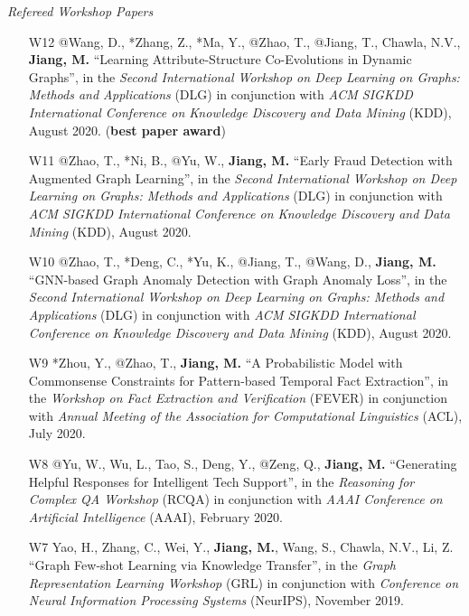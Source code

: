 \documentclass[10pt]{article}
\newenvironment{myindentpar}[1]%
{\begin{list}{}%
         {\setlength{\leftmargin}{#1}}%
         \item[]%
}
{\end{list}}
\newcounter{list}
\begin{document}
\begin{myindentpar}{0.00cm}
\hspace{-0.25cm}\textit{Refereed Workshop Papers}

\begin{enumerate}[leftmargin=.5cm]

\item[W12] @Wang, D., *Zhang, Z., *Ma, Y., @Zhao, T., @Jiang, T., Chawla, N.V., \textbf{Jiang, M.} ``Learning Attribute-Structure Co-Evolutions in Dynamic Graphs'', in the \textit{Second International Workshop on Deep Learning on Graphs: Methods and Applications} (DLG) in conjunction with \textit{ACM SIGKDD International Conference on Knowledge Discovery and Data Mining} (KDD), August 2020. (\textbf{best paper award})
		
\item[W11] @Zhao, T., *Ni, B., @Yu, W., \textbf{Jiang, M.} ``Early Fraud Detection with Augmented Graph Learning'', in the \textit{Second International Workshop on Deep Learning on Graphs: Methods and Applications} (DLG) in conjunction with \textit{ACM SIGKDD International Conference on Knowledge Discovery and Data Mining} (KDD), August 2020.

\item[W10] @Zhao, T., *Deng, C., *Yu, K., @Jiang, T., @Wang, D., \textbf{Jiang, M.} ``GNN-based Graph Anomaly Detection with Graph Anomaly Loss'', in the \textit{Second International Workshop on Deep Learning on Graphs: Methods and Applications} (DLG) in conjunction with \textit{ACM SIGKDD International Conference on Knowledge Discovery and Data Mining} (KDD), August 2020.

\item[W9] *Zhou, Y., @Zhao, T., \textbf{Jiang, M.} ``A Probabilistic Model with Commonsense Constraints for Pattern-based Temporal Fact Extraction'', in the \textit{Workshop on Fact Extraction and Verification} (FEVER) in conjunction with \textit{Annual Meeting of the Association for Computational Linguistics} (ACL), July 2020.

\item[W8] @Yu, W., Wu, L., Tao, S., Deng, Y., @Zeng, Q., \textbf{Jiang, M.} ``Generating Helpful Responses for Intelligent Tech Support'', in the \textit{Reasoning for Complex QA  Workshop} (RCQA) in conjunction with \textit{AAAI Conference on Artificial Intelligence} (AAAI), February 2020.

\item[W7] Yao, H., Zhang, C., Wei, Y., \textbf{Jiang, M.}, Wang, S., Chawla, N.V., Li, Z. ``Graph Few-shot Learning via Knowledge Transfer'', in the \textit{Graph Representation Learning Workshop} (GRL) in conjunction with \textit{Conference on Neural Information Processing Systems} (NeurIPS), November 2019.
	

\end{enumerate}
\end{myindentpar}
\end{document}
